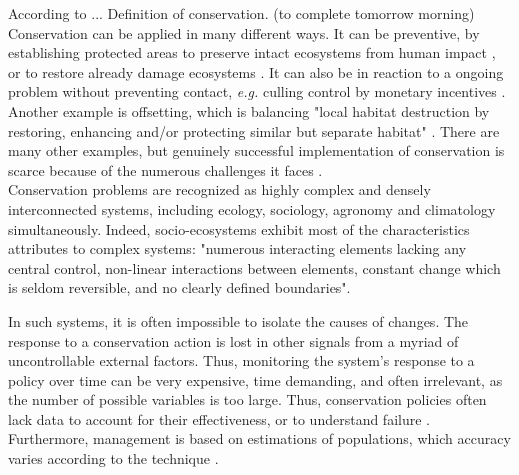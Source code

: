 \documentclass[12pt,a4paper]{article}
\begin{document}
According to ... Definition of conservation. (to complete tomorrow morning)\\
Conservation can be applied in many different ways.
It can be preventive, by establishing protected areas to preserve intact ecosystems from human impact \citep{vanwilgen2011critical, bainbridge2017goose}, or to restore already damage ecosystems \citep{rumpff2011state}. 
It can also be in reaction to a ongoing problem without preventing contact, \textit{e.g.} culling control by monetary incentives \citep{mason2017changing, cusack2018time}.
Another example is offsetting, which is balancing "local habitat destruction by restoring, enhancing and/or protecting similar but separate habitat" \citep{gordon2011assessing}.
There are many other examples, but genuinely successful implementation of conservation is scarce because of the numerous challenges it faces \citep{keith2011uncertainty, vanwilgen2011critical}.\\
%

Conservation problems are recognized as highly complex and densely interconnected systems, including ecology, sociology, agronomy and climatology simultaneously.
Indeed, socio-ecosystems exhibit most of the characteristics \cite{game2013conservation} attributes to complex systems: "numerous interacting elements lacking any central control, non-linear interactions between elements, constant change which is seldom reversible, and no clearly defined boundaries".

In such systems, it is often impossible to isolate the causes of changes.
The response to a conservation action is lost in other signals from a myriad of uncontrollable external factors.
Thus, monitoring the system's response to a policy over time can be very expensive, time demanding, and often irrelevant, as the number of possible variables is too large.
Thus, conservation policies often lack data to account for their effectiveness, or to understand failure \citep{keith2011uncertainty}.
Furthermore, management is based on estimations of populations, which accuracy varies according to the technique \citep{BUNNEFELD2011441}.
\end{document}

